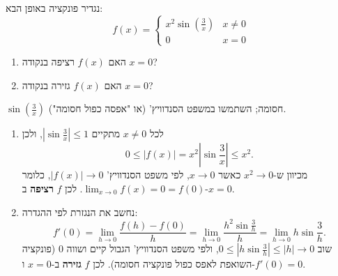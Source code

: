 
\begin{question}
נגדיר פונקציה באופן הבא:
\[ f(x)=\begin{cases} x^2\sin\left(\frac{3}{x}\right) & x\neq0\\ 0 & x=0\end{cases} \]
\begin{enumerate}
  \item האם $f(x)$ רציפה בנקודה $x=0$?
  \item האם $f(x)$ גזירה בנקודה $x=0$?
\end{enumerate}
\end{question}

\begin{hint}
$\sin\left(\frac3x\right)$ חסומה; השתמשו במשפט הסנדוויץ' (או "אפסה כפול חסומה").
\end{hint}

\begin{solution}
\begin{enumerate}
  \item לכל $x\neq0$ מתקיים $\left|\sin\frac3x\right|\le1$, ולכן
  \[ 0\le |f(x)|=x^2\left|\sin\frac3x\right|\le x^2. \]
  מכיוון ש-$x^2\to0$ כאשר $x\to0$, לפי משפט הסנדוויץ' $|f(x)|\to0$, כלומר $\lim_{x\to0}f(x)=0=f(0)$. לכן $f$ \textbf{רציפה} ב-$x=0$.
  \item נחשב את הנגזרת לפי ההגדרה:
  \[ f'(0)=\lim_{h\to0}\frac{f(h)-f(0)}{h}=\lim_{h\to0}\frac{h^2\sin\frac3h}{h}=\lim_{h\to0}h\sin\frac3h. \]
  שוב $0\le\left|h\sin\frac3h\right|\le|h|\to0$, ולפי משפט הסנדוויץ' הגבול קיים ושווה $0$ (פונקציה השואפת לאפס כפול פונקציה חסומה). לכן $f$ \textbf{גזירה} ב-$x=0$ ו-$f'(0)=0$.
\end{enumerate}
\end{solution}
